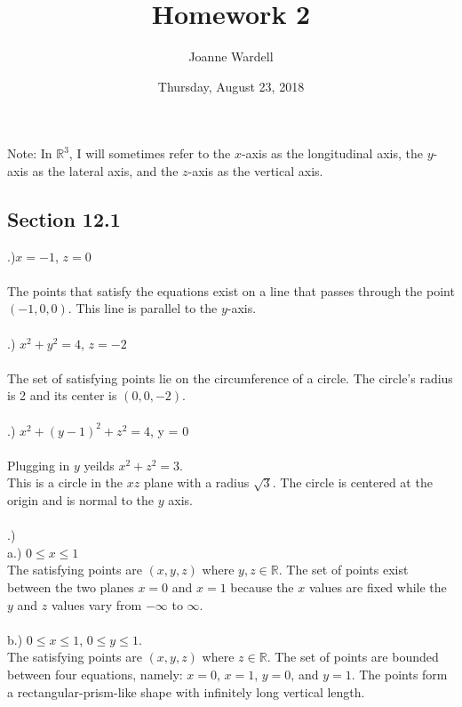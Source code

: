 \documentclass[12pt]{article}
\title{\vspace{-2.0cm}Homework 2}
\author{Joanne Wardell}
\date{Thursday, August 23, 2018}
\begin{document}
\maketitle
\begin{footnotesize}
\noindent Note: In $\mathbb{R}^{3}$, I will sometimes refer to the $x$-axis as the longitudinal axis, 
the $y$-axis as the lateral axis, and the $z$-axis as the vertical axis.\
\end{footnotesize}
\subsection*{Section 12.1}
.)$x = -1$, \hspace{10pt}$z = 0$\\\\
The points that satisfy the equations exist on a line that passes through the point $(-1, 0, 0)$. This line is parallel to the $y$-axis.\\\\

.) $x^{2} + y^{2} = 4$, \hspace{10pt} $z = -2$\\\\
The set of satisfying points lie on the circumference of a circle. The circle's radius is 
2 and its center is $(0, 0, -2)$.\\\\

.) $x^{2} + (y-1)^{2} + z^{2} = 4$, \hspace{10pt} y = 0\\\\

\noindent Plugging in $y$ yeilds $x^{2} + z^{2} = 3$.\\

\noindent This is a circle in the $xz$ plane with a radius $\sqrt{3}$. The circle is centered at the origin 
and is normal to the $y$ axis. \\\\


.)\\
\noindent a.) $0 \leq x \leq 1$\\
The satisfying points are $(x,y,z)$ where $y,z \in \mathbb{R}$. The set of points exist between 
the two planes $x = 0$ and $x = 1$ because the $x$ values are fixed while the $y$ and $z$ values 
vary from $-\infty$ to $\infty$.\\\\
\noindent b.) $0 \leq x \leq 1$, \hspace{10pt} $0 \leq y \leq 1$.\\
\noindent The satisfying points are $(x,y,z)$ where $z \in \mathbb{R}$. The set of points are bounded between 
four equations, namely: $x = 0$, $x = 1$, $y = 0$, and $y = 1$. The points form a rectangular-prism-like 
shape with infinitely long vertical length.\\\\
\end{document}
